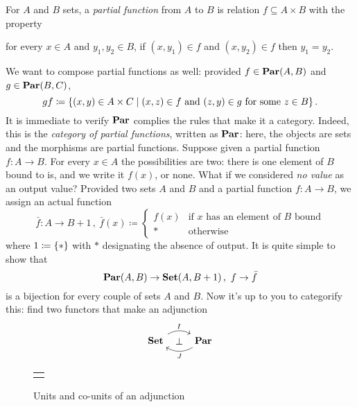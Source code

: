 \begin{exercise}
For \(A\) and \(B\) sets, a {\em partial function} from \(A\) to \(B\) is relation \(f \subseteq A \times B\) with the property
\begin{center}
for every \(x \in A\) and \(y_1, y_2 \in B\), if \((x, y_1) \in f\) and \((x, y_2) \in f\) then \(y_1 = y_2\).
\end{center}
We want to compose partial functions as well: provided \(f \in \mathbf{Par}(A, B)\) and \(g \in \mathbf{Par}(B, C)\),
\[gf \coloneq \left\{(x, y) \in A \times C \mid (x, z) \in f \text{ and } (z, y) \in g \text{ for some } z \in B\right\} .\]
It is immediate to verify \(\mathbf{Par}\) complies the rules that make it a category. Indeed, this is the {\em category of partial functions}, written as \(\mathbf{Par}\): here, the objects are sets and the morphisms are partial functions.\newline
Suppose given a partial function \(f : A \to B\). For every \(x \in A\) the possibilities are two: there is one element of \(B\) bound to is, and we write it \(f(x)\), or none. What if we considered {\em no value} as an output value? Provided two sets \(A\) and \(B\) and a partial function \(f : A \to B\), we assign an actual function
\[\bar f : A \to B+1 \,, \ \bar f(x) \coloneq \begin{cases} f(x) & \text{if \(x\) has an element of \(B\) bound} \\ \ast & \text{otherwise} \end{cases}\]
where \(1 \coloneq \left\{\ast\right\}\) with \(\ast\) designating the absence of output. It is quite simple to show that
\[\mathbf{Par}(A, B) \to \mathbf{Set}(A, B+1)\,,\ f \to \bar f\]
is a bijection for every couple of sets \(A\) and \(B\). Now it's up to you to categorify this: find two functors that make an adjunction
\[\begin{tikzcd}
\Set \ar["I"{name=I}, r, bend left] & \Par \ar["J"{name=J}, l, bend left]
\ar["\perp"{description}, phantom, from=I, to=J]
\end{tikzcd}\]
\end{exercise}

\begin{figure}
\centering
\begin{tabular}{c}
 \\
\midrule \\

\end{tabular}
\caption{Units and co-units of an adjunction}
\end{figure}

